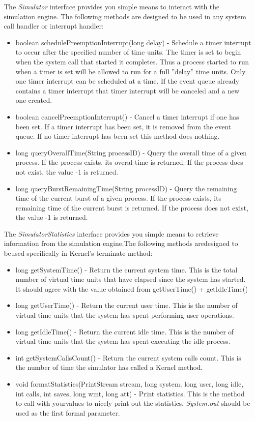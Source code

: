 \documentclass[11pt,a4paper]{scrreprt}
\begin{document}
The \textit{Simulator} interface provides you simple means to interact with the simulation engine. The following methods are designed to be used in any system call handler or interrupt handler:
\begin{itemize}
\item boolean schedulePreemptionInterrupt(long delay) - Schedule a timer interrupt to occur after the specified number of time units. The timer is set to begin when the system call that started it completes. Thus a process started to run when a timer is set will be allowed to run for a full ''delay'' time units.
Only one timer interrupt can be scheduled at a time. If the event queue already contains a timer interrupt that timer interrupt will be canceled and a new one created.
\item boolean cancelPreemptionInterrupt() - Cancel a timer interrupt if one has been set. If a timer interrupt has been set, it is removed from the event queue. If no timer interrupt has been set this method does nothing.
\item long queryOverallTime(String processID) - Query the overall time of a given process. If the process exists, its overal time is returned. If the process does not exist, the value -1 is returned.
\item long queryBurstRemainingTime(String processID) - Query the remaining time of the current burst of a given process. If the process exists, its remaining time of the current burst is returned. If the process does not exist, the value -1 is returned.
\end{itemize}

The \textit{SimulatorStatistics} interface provides you simple means to retrieve information from the simulation engine.The following methods aredesigned to beused specifically in Kernel's terminate method:
\begin{itemize}
\item long getSystemTime() - Return the current system time. This is the total number of virtual time units that have elapsed since the system has started. It should agree with the value obtained from getUserTime() + getIdleTime()
\item long getUserTime() - Return the current user time. This is the number of virtual time units that the system has spent performing user operations.
\item long getIdleTime() - Return the current idle time. This is the number of virtual time units that the system has spent executing the idle process.
\item int getSystemCallsCount() - Return the current system calls count. This is the number of time the simulator has called a Kernel method.
\item void formatStatistics(PrintStream stream, long system, long user, long idle, int calls, int saves, long wmt, long att) - Print statistics. This is the method to call with yourvalues to nicely print out the statistics. \textit{System.out} should be used as the first formal parameter.
\end{itemize}
\end{document}
